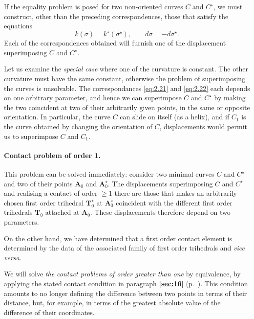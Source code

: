 \documentclass[leqno,11pt]{book}
\numberwithin{equation}{chapter}
\theoremstyle{shape1}
\theoremstyle{shapesmall}
\newcommand{\fsref}[1]{{\rm\textsection\textbf{\ref{sec:#1}}}}
\newcommand{\str}{^{\star}}
\begin{document}
If the equality problem is posed for two non-oriented curves $C$ and $C\str$, we must construct, other than the preceding correspondences, those that satisfy the equations
\begin{equation}
  \label{eq:2.22}
  k(\sigma)=k\str(\sigma\str),\qquad d\sigma=-d\sigma\str.
\end{equation}
Each of the correspondences obtained will furnish one of the displacement superimposing $C$ and $C\str$.

Let us examine the \emph{special case} where one of the curvature is constant. The other curvature must have the same constant, otherwise the problem of superimposing the curves is unsolvable. The correspondances \eqref{eq:2.21} and \eqref{eq:2.22} each depends on one arbitrary parameter, and hence we can superimpose $C$ and $C\str$ by making the two coincident at two of their arbitrarily given points, in the same or opposite orientation. In particular, the curve $C$ can slide on itself (as a helix), and if $C_{1}$ is the curve obtained by changing the orientation of $C$, displacements would permit us to superimpose $C$ and $C_{1}$.

\paragraph{Contact problem of order 1.}
\label{sec:32}
This problem can be solved immediately: consider two minimal curves $C$ and $C\str$ and two of their points $\mathbf{A}_{0}$ and $\mathbf{A}_{0}\str$. The displacements superimposing $C$ and $C\str$ and realising a contact of order $\ge 1$ there are those that makes an arbitrarily chosen first order trihedral $\mathbf{T}\str_{0}$ at $\mathbf{A}\str_{0}$ coincident with the different first order trihedrals $\mathbf{T}_{0}$ attached at $\mathbf{A}_{0}$. These displacements therefore depend on two parameters.

On the other hand, we have determined that a first order contact element is determined by the data of the associated family of first order trihedrals and \emph{vice versa}.

We will solve \emph{the contact problems of order greater than one} by equivalence, by applying the stated contact condition in paragraph \fsref{16} (p.~\pageref{sec:16}). This condition amounts to no longer defining the difference between two points in terms of their distance, but, for example, in terms of the greatest absolute value of the difference of their coordinates.
\end{document}

